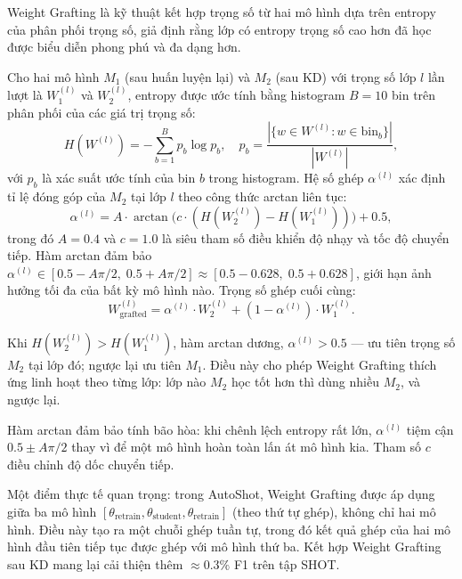 Weight Grafting là kỹ thuật kết hợp trọng số từ hai mô hình dựa trên entropy của phân phối trọng số, giả định rằng lớp có entropy trọng số cao hơn đã học được biểu diễn phong phú và đa dạng hơn.

Cho hai mô hình $M_1$ (sau huấn luyện lại) và $M_2$ (sau KD) với trọng số lớp $l$ lần lượt là $W_1^{(l)}$ và $W_2^{(l)}$, entropy được ước tính bằng histogram $B = 10$ bin trên phân phối của các giá trị trọng số:
\begin{equation}
    H(W^{(l)}) = -\sum_{b=1}^{B} p_b \log p_b, \quad p_b = \frac{|\{w \in W^{(l)} : w \in \mathrm{bin}_b\}|}{|W^{(l)}|},
    \label{eq:weight_entropy}
\end{equation}
với $p_b$ là xác suất ước tính của bin $b$ trong histogram. Hệ số ghép $\alpha^{(l)}$ xác định tỉ lệ đóng góp của $M_2$ tại lớp $l$ theo công thức arctan liên tục:
\begin{equation}
    \alpha^{(l)} = A \cdot \arctan\!\bigl(c \cdot (H(W_2^{(l)}) - H(W_1^{(l)}))\bigr) + 0.5,
    \label{eq:grafting_alpha}
\end{equation}
trong đó $A = 0.4$ và $c = 1.0$ là siêu tham số điều khiển độ nhạy và tốc độ chuyển tiếp. Hàm arctan đảm bảo $\alpha^{(l)} \in [0.5 - A\pi/2,\; 0.5 + A\pi/2] \approx [0.5 - 0.628,\; 0.5 + 0.628]$, giới hạn ảnh hưởng tối đa của bất kỳ mô hình nào. Trọng số ghép cuối cùng:
\begin{equation}
    W_{\mathrm{grafted}}^{(l)} = \alpha^{(l)} \cdot W_2^{(l)} + (1 - \alpha^{(l)}) \cdot W_1^{(l)}.
    \label{eq:grafting}
\end{equation}

Khi $H(W_2^{(l)}) > H(W_1^{(l)})$, hàm arctan dương, $\alpha^{(l)} > 0.5$ — ưu tiên trọng số $M_2$ tại lớp đó; ngược lại ưu tiên $M_1$. Điều này cho phép Weight Grafting thích ứng linh hoạt theo từng lớp: lớp nào $M_2$ học tốt hơn thì dùng nhiều $M_2$, và ngược lại.

Hàm arctan đảm bảo tính bão hòa: khi chênh lệch entropy rất lớn, $\alpha^{(l)}$ tiệm cận $0.5 \pm A\pi/2$ thay vì để một mô hình hoàn toàn lấn át mô hình kia. Tham số $c$ điều chỉnh độ dốc chuyển tiếp.

Một điểm thực tế quan trọng: trong AutoShot, Weight Grafting được áp dụng giữa ba mô hình $[\theta_{\mathrm{retrain}}, \theta_{\mathrm{student}}, \theta_{\mathrm{retrain}}]$ (theo thứ tự ghép), không chỉ hai mô hình. Điều này tạo ra một chuỗi ghép tuần tự, trong đó kết quả ghép của hai mô hình đầu tiên tiếp tục được ghép với mô hình thứ ba. Kết hợp Weight Grafting sau KD mang lại cải thiện thêm $\approx 0.3\%$ F1 trên tập SHOT.

